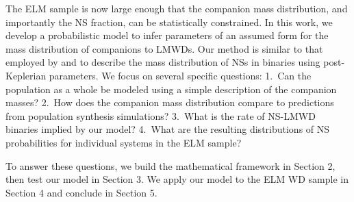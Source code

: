 \documentclass[apjl]{emulateapj}
\begin{document}
The ELM sample is now large enough that the companion mass distribution, and importantly the NS fraction, can be statistically constrained. 
In this work, we develop a probabilistic model to infer parameters of an assumed form for the mass distribution of companions to LMWDs. Our method is similar to that employed by \citet{ozel12} and \citet{kiziltan13} to describe the mass distribution of NSs in binaries using post-Keplerian parameters. We focus on several specific questions: 1.\ Can the population as a whole be modeled using a simple description of the companion masses? 2.\ How does the companion mass distribution compare to predictions from population synthesis simulations?  3.\ What is the rate of NS-LMWD binaries implied by our model? 4.\ What are the resulting distributions of NS probabilities for individual systems in the ELM sample? 


To answer these questions, we build the mathematical framework in Section 2, then test our model in Section 3. We apply our model to the ELM WD sample in Section 4 and conclude in Section 5.
\end{document}
